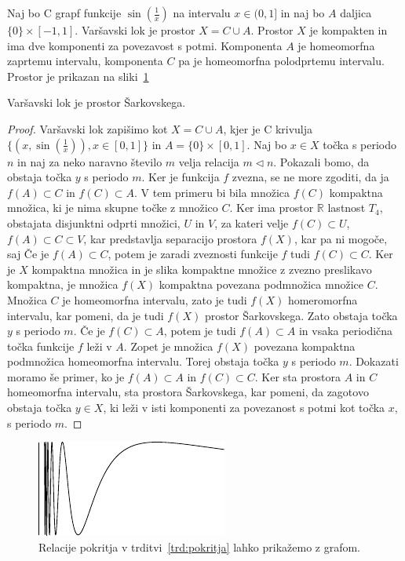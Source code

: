 \documentclass[mat2]{fmfdelo}
\newcommand{\R}{\mathbb R}
\begin{document}
\begin{definicija}
Naj bo C grapf funkcije $\sin\left(\frac{1}{x}\right)$ na intervalu $x \in (0 , 1]$ in naj bo $A$ daljica $\{ 0 \} \times [-1 , 1]$. Varšavski lok je prostor $X = C \cup A$.
Prostor $X$ je kompakten in ima dve komponenti za povezavost s potmi. Komponenta $A$ je homeomorfna zaprtemu intervalu, komponenta $C$ pa je homeomorfna polodprtemu intervalu. Prostor je prikazan na sliki~\ref{fig:varsavski_lok}
\end{definicija}

\begin{trditev}
Varšavski lok je prostor Šarkovskega.
\end{trditev}
\begin{proof}
Varšavski lok zapišimo kot $X = C \cup A$, kjer je C krivulja $\{(x, \sin(\frac{1}{x})), x\in [0, 1]\}$ in $A= \{0\} \times [0, 1]$. Naj bo $x \in X$ točka s periodo $n$ in naj za neko naravno število $m$ velja relacija $m \triangleleft n$. Pokazali bomo, da obstaja točka $y$ s periodo $m$. Ker je funkcija $f$ zvezna, se ne more zgoditi, da ja $f(A) \subset C$ in $f(C) \subset A$. V tem primeru bi bila množica $f(C)$ kompaktna množica, ki je nima skupne točke z množico $C$. Ker ima prostor $\R$ lastnost $T_4$, obstajata disjunktni odprti množici, $U$ in $V$, za kateri velje $f(C) \subset U$, $f(A) \subset C \subset V$, kar predstavlja separacijo prostora $f(X)$, kar pa ni mogoče, saj Če je $f(A) \subset C$, potem je zaradi zveznosti funkcije $f$ tudi $f(C) \subset C$. Ker je $X$ kompaktna množica in je slika kompaktne množice z zvezno preslikavo kompaktna, je množica $f(X)$ kompaktna povezana podmnožica množice $C$. Množica $C$ je homeomorfna intervalu, zato je tudi $f(X)$ homeromorfna intervalu, kar pomeni, da je tudi $f(X)$ prostor Šarkovskega. Zato obstaja točka $y$ s periodo $m$. Če je $f ( C ) \subset A $, potem je tudi $f ( A ) \subset A $ in vsaka periodična točka funkcije $f$ leži v $A$.  Zopet je množica $f(X)$ povezana kompaktna podmnožica homeomorfna intervalu. Torej obstaja točka $y$ s periodo $m$. 
Dokazati moramo še primer, ko je $f ( A ) \subset A $ in $f ( C ) \subset C $. Ker sta prostora $A$ in $C$ homeomorfna intervalu, sta prostora Šarkovskega, kar pomeni, da zagotovo obstaja točka $y \in X$, ki leži v isti komponenti za povezanost s potmi kot točka $x$, s periodo $m$.
\end{proof}

\begin{figure}[h]
  \centering
  \includegraphics{images/varsavskilok.pdf}
  \caption[Primer vektorske slike.]{Relacije pokritja v trditvi~\ref{trd:pokritja} lahko prikažemo z grafom.}
  \label{fig:varsavski_lok}
\end{figure}
\end{document}
